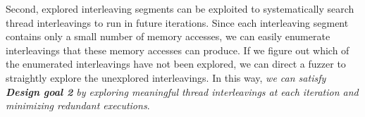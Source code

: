 




Second, explored interleaving segments can be exploited to
systematically search thread interleavings to run in future
iterations.
%
Since each interleaving segment contains only a small number of memory
accesses, we can easily enumerate interleavings that these memory
accesses can produce.
%
If we figure out which of the enumerated interleavings have not been
explored, we can direct a fuzzer to straightly explore the unexplored
interleavings.
%
In this way, \textit{we can satisfy \textbf{Design goal 2} by
  exploring meaningful thread interleavings at each iteration and
  minimizing redundant executions}.



